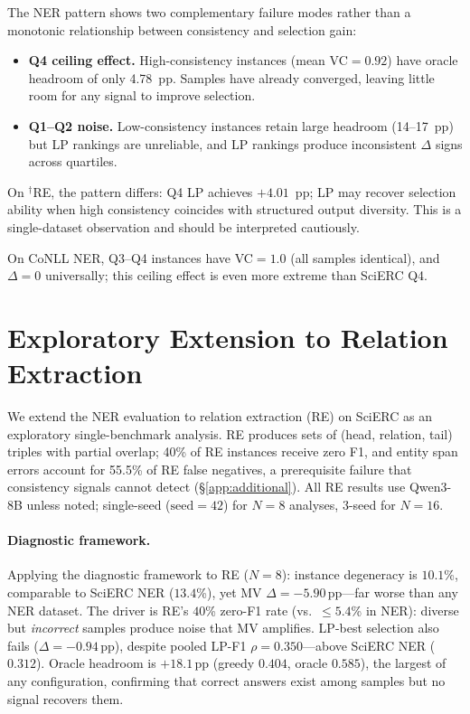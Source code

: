 The NER pattern shows two complementary failure modes rather than a monotonic relationship between consistency and selection gain:
\begin{itemize}
\item \textbf{Q4 ceiling effect.} High-consistency instances (mean VC${=}0.92$) have oracle headroom of only 4.78~pp. Samples have already converged, leaving little room for any signal to improve selection.
\item \textbf{Q1--Q2 noise.} Low-consistency instances retain large headroom (14--17~pp) but LP rankings are unreliable, and LP rankings produce inconsistent $\Delta$ signs across quartiles.
\end{itemize}

On $^\dagger$RE, the pattern differs: Q4 LP achieves $+4.01$~pp; LP may recover selection ability when high consistency coincides with structured output diversity. This is a single-dataset observation and should be interpreted cautiously.

On CoNLL NER, Q3--Q4 instances have VC${=}1.0$ (all samples identical), and $\Delta{=}0$ universally; this ceiling effect is even more extreme than SciERC Q4.

\section{Exploratory Extension to Relation Extraction}\label{app:re_extension}

We extend the NER evaluation to relation extraction (RE) on SciERC as an exploratory single-benchmark analysis.
RE produces sets of (head, relation, tail) triples with partial overlap; 40\% of RE instances receive zero F1, and entity span errors account for 55.5\% of RE false negatives, a prerequisite failure that consistency signals cannot detect (\S\ref{app:additional}).
All RE results use Qwen3-8B unless noted; single-seed ($\text{seed}{=}42$) for $N{=}8$ analyses, 3-seed for $N{=}16$.

\paragraph{Diagnostic framework.}
Applying the diagnostic framework to RE ($N{=}8$): instance degeneracy is $10.1$\%, comparable to SciERC NER ($13.4$\%), yet MV $\Delta{=}{-}5.90$\,pp---far worse than any NER dataset.
The driver is RE's $40$\% zero-F1 rate (vs.\ ${\leq}5.4$\% in NER): diverse but \textit{incorrect} samples produce noise that MV amplifies.
LP-best selection also fails ($\Delta{=}{-}0.94$\,pp), despite pooled LP-F1 $\rho{=}0.350$---above SciERC NER ($0.312$).
Oracle headroom is $+18.1$\,pp (greedy $0.404$, oracle $0.585$), the largest of any configuration, confirming that correct answers exist among samples but no signal recovers them.

